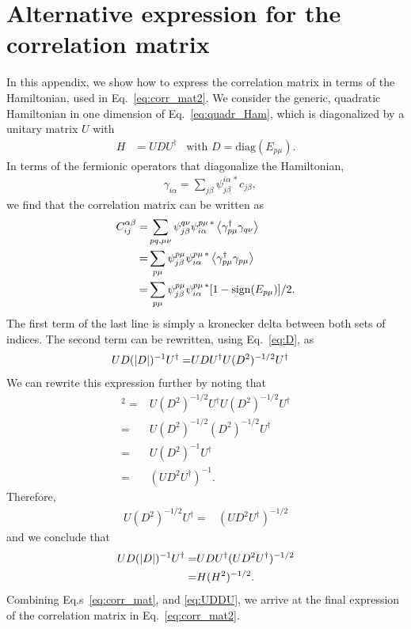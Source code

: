 \documentclass[twocolumn,amsmath,longbibliography,amssymb,superscriptaddress]{revtex4-1}
\begin{document}
\section{Alternative expression for the correlation matrix}\label{app:CM}
In this appendix, we show how to express the correlation matrix in terms of the Hamiltonian, used in Eq.~\eqref{eq:corr_mat2}. 
We consider the generic, quadratic Hamiltonian in one dimension of Eq.~\eqref{eq:quadr_Ham}, which is diagonalized by a unitary matrix $U$ with 
	\begin{align}\label{eq:D}
	H&=UDU^\dagger& \mbox{with } D=\mbox{diag}(E_{p\mu}).
	\end{align} 
In terms of the fermionic operators that diagonalize the Hamiltonian, 
\begin{align}
& \gamma_{i\alpha} = \sum_{j\beta}\psi_{j\beta}^{i\alpha \, \ast} c_{j\beta},
\end{align}
we find that the correlation matrix can be written as 
\begin{align}\label{eq:corr_mat}
C_{ij}^{\alpha \beta} =& \sum_{pq,\mu\nu} \psi^{q\nu }_{j\beta} \psi^{p\mu \, \ast}_{i\alpha} \expval{\gamma^\dagger_{p\mu} \gamma_{q\nu} }\nonumber \\
=&  \sum_{p\mu} \psi^{p\mu }_{j\beta} \psi^{p\mu \, \ast}_{i\alpha} \expval{\gamma^\dagger_{p\mu} \gamma_{p\mu} }\nonumber \\
=&  \sum_{p\mu} \psi^{p\mu }_{j\beta} \psi^{p\mu \, \ast}_{i\alpha} [1-{\rm sign}(E_{p\mu})]/2.
\end{align}
The first term of the last line is simply a kronecker delta between both sets of indices. The second term can be rewritten, using Eq.~\eqref{eq:D}, as
\begin{align}
UD(\abs{D})^{-1}U^\dagger =& UDU^\dagger U(D^2)^{-1/2}U^\dagger
\end{align}
We can rewrite this expression further by noting that 
\begin{align}
[U (D^2)^{-1/2} U^\dagger]^2 =& U (D^2)^{-1/2} U^\dagger U  (D^2)^{-1/2} U^\dagger \nonumber\\
=&  U (D^2)^{-1/2}  (D^2)^{-1/2} U^\dagger \nonumber\\
=&  U (D^2)^{-1} U^\dagger \nonumber\\
=&  (U D^2 U^\dagger)^{-1}.
\end{align}
Therefore,
\begin{align*}
U (D^2)^{-1/2} U^\dagger =&(U D^2 U^\dagger)^{-1/2} 
\end{align*}
and we conclude that
\begin{align}\label{eq:UDDU}
UD(\abs{D})^{-1}U^\dagger =& UDU^\dagger(U D^2 U^\dagger)^{-1/2} \nonumber\\ 
=& H(H^2)^{-1/2}.
\end{align}
Combining Eq.s~\eqref{eq:corr_mat},  and \eqref{eq:UDDU}, we arrive at the final expression of the correlation matrix in Eq.~\eqref{eq:corr_mat2}. 
\end{document}
